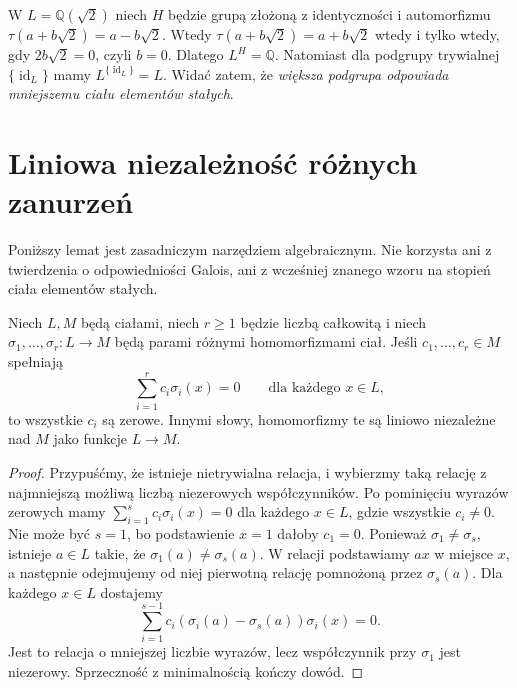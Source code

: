 \begin{przyklad}
\label{aa:prz:fixed-quadratic}
W $L=\mathbb Q(\sqrt2)$ niech $H$ będzie grupą
złożoną z identyczności i automorfizmu
$\tau(a+b\sqrt2)=a-b\sqrt2$. Wtedy
$\tau(a+b\sqrt2)=a+b\sqrt2$ wtedy i tylko wtedy,
gdy $2b\sqrt2=0$, czyli $b=0$.
Dlatego $L^H=\mathbb Q$. Natomiast dla podgrupy
trywialnej $\{\operatorname{id}_L\}$ mamy
$L^{\{\operatorname{id}_L\}}=L$.
Widać zatem, że \emph{większa podgrupa odpowiada
mniejszemu ciału elementów stałych}.
\end{przyklad}

\section{Liniowa niezależność różnych zanurzeń}
Poniższy lemat jest zasadniczym narzędziem algebraicznym.
Nie korzysta ani z twierdzenia o odpowiedniości Galois,
ani z wcześniej znanego wzoru na stopień ciała elementów stałych.

\begin{lemat}
\label{aa:lem:artin-independence}
Niech $L,M$ będą ciałami, niech $r\ge1$ będzie liczbą
całkowitą i niech
$\sigma_1,\ldots,\sigma_r:L\to M$ będą parami różnymi
homomorfizmami ciał. Jeśli $c_1,\ldots,c_r\in M$ spełniają
\[
\sum_{i=1}^r c_i\sigma_i(x)=0\qquad\text{dla każdego }x\in L,
\]
to wszystkie $c_i$ są zerowe. Innymi słowy, homomorfizmy
te są liniowo niezależne nad $M$ jako funkcje $L\to M$.
\end{lemat}
\begin{proof}
Przypuśćmy, że istnieje nietrywialna relacja, i wybierzmy
taką relację z najmniejszą możliwą liczbą niezerowych
współczynników. Po pominięciu wyrazów zerowych mamy
$\sum_{i=1}^s c_i\sigma_i(x)=0$ dla każdego $x\in L$,
gdzie wszystkie $c_i\ne0$. Nie może być $s=1$, bo
podstawienie $x=1$ dałoby $c_1=0$.
Ponieważ $\sigma_1\ne\sigma_s$, istnieje $a\in L$ takie,
że $\sigma_1(a)\ne\sigma_s(a)$.
W relacji podstawiamy $ax$ w miejsce $x$, a następnie
odejmujemy od niej pierwotną relację pomnożoną przez
$\sigma_s(a)$. Dla każdego $x\in L$ dostajemy
\[
\sum_{i=1}^{s-1}c_i(\sigma_i(a)-\sigma_s(a))\sigma_i(x)=0.
\]
Jest to relacja o mniejszej liczbie wyrazów, lecz
współczynnik przy $\sigma_1$ jest niezerowy.
Sprzeczność z minimalnością kończy dowód.
\end{proof}

